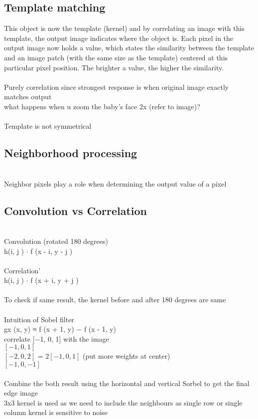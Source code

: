 \documentclass[11pt]{article}
\begin{document}
\subsection*{Template matching }
This object is now the template (kernel) and by correlating an image with this template, the output image indicates where the object is. Each pixel in the output image now holds a value, which states the similarity between the template and an image patch (with the same size as the template) centered at this particular pixel position. The brighter a value, the higher the similarity.
\\\\
Purely correlation since strongest response is when original image exactly matches output\\
what happens when u zoom the baby's face 2x (refer to image)?
\\\\
Template is not symmetrical
\\
\subsection*{Neighborhood processing }\\
Neighbor pixels play a role when determining the output value of a pixel 
\\
\subsection*{Convolution vs Correlation }\\
Convolution (rotated 180 degrees)\\
h(i, j ) $\cdot$ f (x - i, y - j ) 
\\\\
Correlation’\\
h(i, j ) $\cdot$ f (x + i, y + j ) 
\\\\
To check if same result, the kernel before and after 180 degrees are same
\\\\
Intuition of Sobel filter\\
gx (x, y) ≈ f (x + 1, y) − f (x - 1, y) \\
correlate [−1, 0, 1] with the image\\
$[-1,0 ,1]$\\
$[-2 ,0 ,2]$ = $2[-1, 0 ,1]$ (put more weights at center)\\
$[-1 ,0, -1]$\\
\\
Combine the both result using the horizontal and vertical Sorbel to get the final edge image
\\
3x3 kernel is used as we need to include the neighbours as single row or single column kernel is sensitive to noise
\\
\\
\\
\end{document}

